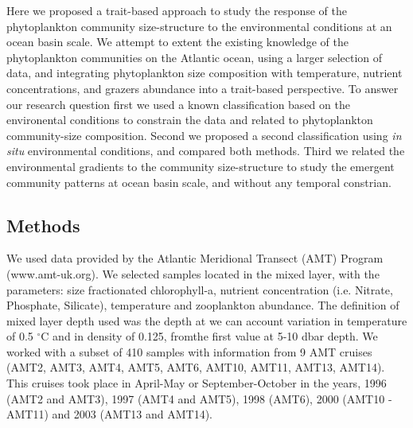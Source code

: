 Here we proposed a trait-based approach to study the response of the phytoplankton community size-structure to the environmental conditions at an ocean basin scale. We attempt to extent the existing knowledge of the phytoplankton communities on the Atlantic ocean, using a larger selection of data, and integrating phytoplankton size composition with temperature, nutrient concentrations, and grazers abundance into a trait-based perspective. To answer our research question first we used a known classification based on the environental conditions \citep{Longhurst2006} to constrain the data and related to phytoplankton community-size composition. Second we proposed a second classification using \textit{in situ} environmental conditions, and compared both methods. Third we related the environmental gradients to the community size-structure to study the emergent community patterns at ocean basin scale, and without any temporal constrian.

\subsection{Methods}

We used data provided by the Atlantic Meridional Transect (AMT) Program (www.amt-uk.org). We selected samples located in the mixed layer, with the parameters: size fractionated chlorophyll-a, nutrient concentration (i.e. Nitrate, Phosphate, Silicate), temperature and zooplankton abundance. The definition of mixed layer depth used was the depth at we can account variation in temperature of 0.5 $^\circ$C and in density of 0.125, fromthe first value at 5-10 dbar depth. We worked with a subset of 410 samples with information from 9 AMT cruises (AMT2, AMT3, AMT4, AMT5, AMT6, AMT10, AMT11, AMT13, AMT14). This cruises took place in April-May or September-October in the years, 1996 (AMT2 and AMT3), 1997 (AMT4 and AMT5), 1998 (AMT6), 2000 (AMT10 -AMT11) and 2003 (AMT13 and AMT14). 

